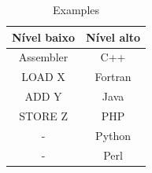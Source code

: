 \documentclass[11pt, letterpaper, portuguese]{article}
\begin{document}
  
    \begin{table}[ht]
        \centering
        \resizebox{4.5 cm}{!} {
        \begin{tabular}{| c | c |}
            \hline
            Nível baixo  & Nível alto \\ \hline
            Assembler   & C++ \\
            LOAD X      & Fortran \\
            ADD Y       & Java \\
            STORE Z     & PHP \\
            -           & Python \\
            -           & Perl \\ \hline
        \end{tabular}}
        \caption{Examples}
   \end{table}
   
\end{document}
